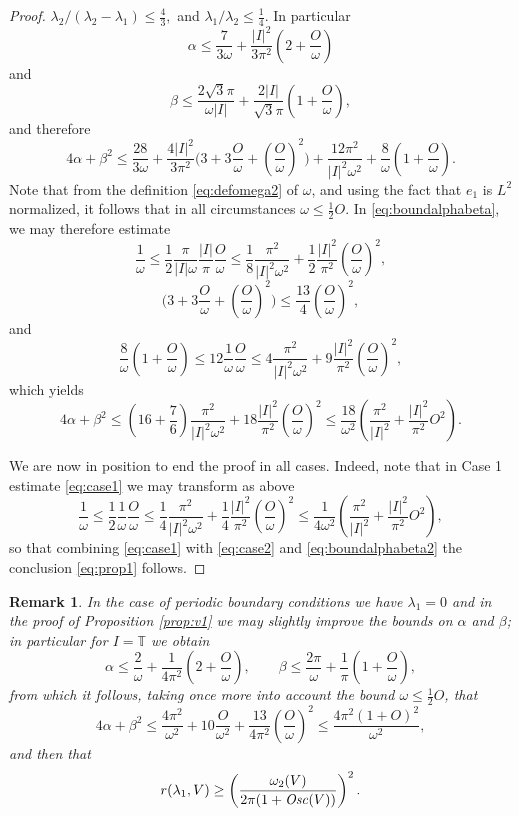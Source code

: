 \documentclass[12pt]{article}
\newtheorem{rem}{Remark}
\newcommand{\T}{\mathbb{T}}
\begin{document}
\begin{proof}
$\lambda_2 / (\lambda_2 - \lambda_1) \leq \frac{4}{3},$ and $\lambda_1 /
\lambda_2 \leq \frac{1}{4}$. In particular
$$
\alpha \leq \frac{7}{3 \omega} + \frac{|I|^2}{3\pi^2}\left(2 + 
\frac{O}{\omega}\right)
$$
and
$$
\beta \leq \frac{2\sqrt{3}\pi}{\omega|I|} + \frac{2|I|}{\sqrt{3}\pi}\left( 1 +
\frac{O}{\omega}\right),
$$
and therefore
\begin{equation}\label{eq:boundalphabeta}
4\alpha + \beta^2 \leq \frac{28}{3\omega} + \frac{4|I|^2}{3\pi^2}
\big(3 + 3\frac{O}{\omega} + (\frac{O}{\omega})^2\big)  
+ \frac{12\pi^2}{|I|^2\omega^2} + \frac{8}{\omega}(1 +  \frac{O}{\omega}).
\end{equation}
Note that from the definition \eqref{eq:defomega2} of $\omega$, and using
the fact that $e_1$ is $L^2$ normalized, it follows that in all
circumstances $\omega \leq \frac{1}{2}O.$ 
In \eqref{eq:boundalphabeta}, we may therefore estimate
$$
\frac{1}{\omega} \leq \frac{1}{2}\frac{\pi}{|I|\omega} \frac{|I|}{\pi}
\frac{O}{\omega} \leq \frac{1}{8} \frac{\pi^2}{|I|^2\omega^2} +
\frac{1}{2} \frac{|I|^2}{\pi^2}(\frac{O}{\omega})^2,
$$
$$
\big(3 + 3\frac{O}{\omega} + (\frac{O}{\omega})^2\big) \leq \frac{13}{4}(
\frac{O}{\omega})^2,
$$
and 
$$
\frac{8}{\omega}(1+ \frac{O}{\omega}) \leq 12 \frac{1}{\omega} \frac{O}{\omega} 
\leq 4\frac{\pi^2}{|I|^2\omega^2} + 9
\frac{|I|^2}{\pi^2} (\frac{O}{\omega})^2,
$$
which yields
\begin{equation}\label{eq:boundalphabeta2}
4\alpha + \beta^2 \leq (16 + \frac{7}{6}) \frac{\pi^2}{|I|^2\omega^2} +
18\frac{|I|^2}{\pi^2} (\frac{O}{\omega})^2 \leq \frac{18}{\omega^2} 
\left( \frac{\pi^2}{|I|^2} +
\frac{|I|^2}{\pi^2} O^2\right).
\end{equation}

We are now in position to end the proof in all cases. Indeed, note that in 
Case 1 estimate \eqref{eq:case1} we may transform as above  
$$
\frac{1}{\omega}  \leq \frac{1}{2}\frac{1}{\omega}\frac{O}{\omega} 
\leq 
\frac{1}{4}\frac{\pi^2}{|I|^2\omega^2} + 
\frac{1}{4}\frac{|I|^2}{\pi^2}(\frac{O}{\omega})^2
\leq
\frac{1}{4\omega^2} \left( \frac{\pi^2}{|I|^2} +
\frac{|I|^2}{\pi^2} O^2\right),
$$
so that combining \eqref{eq:case1} with \eqref{eq:case2} and
\eqref{eq:boundalphabeta2} the conclusion \eqref{eq:prop1} follows.  
\end{proof}

\begin{rem}
In the case of periodic boundary conditions we
have $\lambda_1 = 0$ and in the proof of Proposition \ref{prop:v1} we may slightly 
improve the bounds on $\alpha$ and $\beta$; in particular for $I = \T$  we
obtain
$$
\alpha \leq \frac{2}{\omega} + \frac{1}{4\pi^2}(2 + \frac{O}{\omega}), \qquad
\beta \leq \frac{2\pi}{\omega} + \frac{1}{\pi}(1 + \frac{O}{\omega}),
$$
from which it follows, taking once more into account the bound $\omega \leq
\frac{1}{2}O$, that
$$
4\alpha + \beta^2 \leq \frac{4\pi^2}{\omega^2} + 10 \frac{O}{\omega^2} +
\frac{13}{4\pi^2}(\frac{O}{\omega})^2 \leq \frac{4\pi^2(1 + O)^2}{\omega^2},
$$
and then that
\begin{equation}\label{eq:boundimproved}
r(\lambda_1, V) \geq \left( \frac{\omega_2(V)}{2\pi(1 + {\it Osc}(V))}\right)^2.
\end{equation}
\end{rem}
\end{document}
